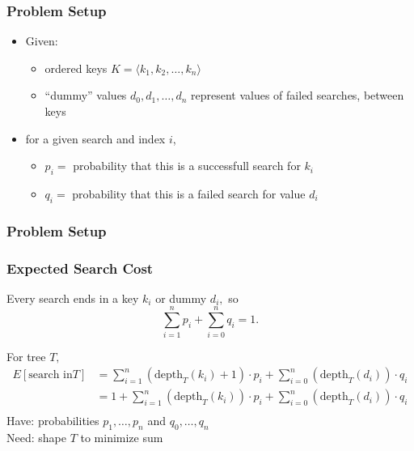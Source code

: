 \documentclass[10pt,aspectratio=169]{beamer}
\begin{document}
\begin{frame} \frametitle{Problem Setup}
\begin{itemize}
  \item Given:
    \begin{itemize}
      \item ordered keys $K = \langle k_1, k_2, \ldots, k_n \rangle$
      \item ``dummy'' values $d_0, d_1, \ldots, d_n$ represent values of failed searches, between keys
    \end{itemize}
  \item for a given search and index $i$,
  \begin{itemize}
    \item $p_i = $ probability that this is a successfull search for $k_i$
    \item $q_i = $ probability that this is a failed search for value $d_i$
  \end{itemize}
\end{itemize}
\end{frame}

\begin{frame} \frametitle{Problem Setup}
\begin{center}
\end{center}
\end{frame}

\begin{frame} \frametitle{Expected Search Cost}
  Every search ends in a key $k_i$ or dummy $d_i,$ so
    \[ \sum_{i=1}^n p_i + \sum_{i=0}^n q_i = 1. \]

  For tree $T,$
  \begin{align*}
    E[\text{search in} T] & = \sum_{i=1}^n (\text{depth}_T(k_i)+1) \cdot p_i + \sum_{i=0}^n (\text{depth}_T(d_i)) \cdot q_i \\
      & = 1 + \sum_{i=1}^n (\text{depth}_T(k_i)) \cdot p_i + \sum_{i=0}^n (\text{depth}_T(d_i)) \cdot q_i \\
  \end{align*}
  Have: probabilities $p_1, \ldots, p_n$ and $q_0, \ldots, q_n$ \\
  Need: shape $T$ to minimize sum
\end{frame}
  
\end{document}
